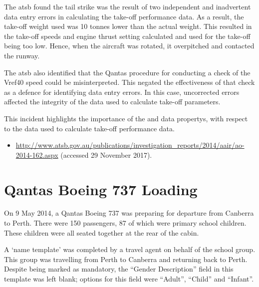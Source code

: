 The \gls{atsb} found the tail strike was the result of two independent and inadvertent data entry errors in calculating the take-off performance data. As a result, the take-off weight used was 10 tonnes lower than the actual weight. This resulted in the take-off speeds and engine thrust setting calculated and used for the take-off being too low. Hence, when the aircraft was rotated, it overpitched and contacted the runway.

The \gls{atsb} also identified that the Qantas procedure for conducting a check of the Vref40 speed could be misinterpreted. This negated the effectiveness of that check as a defence for identifying data entry errors. In this case, uncorrected errors affected the \gls{integrity} of the data used to calculate take-off parameters.

This incident highlights the importance of the  and  \glspl{data property}, with respect to the data used to calculate take-off performance data.

\begin{samepage}
\begin{itemize}
  \item \raggedright{\href{http://www.atsb.gov.au/publications/investigation_reports/2014/aair/ao-2014-162.aspx}{http://www.atsb.gov.au/publications/investigation\_reports/2014/aair/ao-2014-162.aspx} (accessed 29 November 2017).}
\end{itemize}
\end{samepage}

\section{Qantas Boeing 737 Loading} \label{bkm:incacc:qantasloading}
On 9 May 2014, a Qantas Boeing 737 was preparing for departure from Canberra to Perth. There were 150 passengers, 87 of which were primary school children. These children were all seated together at the rear of the cabin. 

A `name template' was completed by a travel agent on behalf of the school group. This group was travelling from Perth to Canberra and returning back to Perth. Despite being marked as mandatory, the ``Gender Description'' field in this template was left blank; options for this field were ``Adult'', ``Child'' and ``Infant''.

